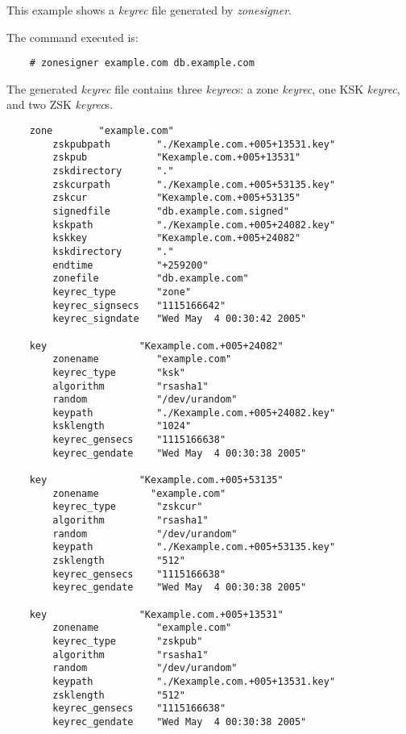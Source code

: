 This example shows a {\it keyrec} file generated by {\it zonesigner}.

The command executed is:

\begin{verbatim}    # zonesigner example.com db.example.com\end{verbatim}

The generated {\it keyrec} file contains three {\it keyrec}s:  a zone {\it
keyrec}, one KSK {\it keyrec}, and two ZSK {\it keyrec}s.

\begin{verbatim}
    zone        "example.com"
        zskpubpath        "./Kexample.com.+005+13531.key"
        zskpub            "Kexample.com.+005+13531"
        zskdirectory      "."
        zskcurpath        "./Kexample.com.+005+53135.key"
        zskcur            "Kexample.com.+005+53135"
        signedfile        "db.example.com.signed"
        kskpath           "./Kexample.com.+005+24082.key"
        kskkey            "Kexample.com.+005+24082"
        kskdirectory      "."
        endtime           "+259200"
        zonefile          "db.example.com"
        keyrec_type       "zone"
        keyrec_signsecs   "1115166642"
        keyrec_signdate   "Wed May  4 00:30:42 2005"

    key                "Kexample.com.+005+24082"
        zonename          "example.com"
        keyrec_type       "ksk"
        algorithm         "rsasha1"
        random            "/dev/urandom"
        keypath           "./Kexample.com.+005+24082.key"
        ksklength         "1024"
        keyrec_gensecs    "1115166638"
        keyrec_gendate    "Wed May  4 00:30:38 2005"

    key                "Kexample.com.+005+53135"
        zonename         "example.com"
        keyrec_type       "zskcur"
        algorithm         "rsasha1"
        random            "/dev/urandom"
        keypath           "./Kexample.com.+005+53135.key"
        zsklength         "512"
        keyrec_gensecs    "1115166638"
        keyrec_gendate    "Wed May  4 00:30:38 2005"

    key                "Kexample.com.+005+13531"
        zonename          "example.com"
        keyrec_type       "zskpub"
        algorithm         "rsasha1"
        random            "/dev/urandom"
        keypath           "./Kexample.com.+005+13531.key"
        zsklength         "512"
        keyrec_gensecs    "1115166638"
        keyrec_gendate    "Wed May  4 00:30:38 2005"
\end{verbatim}



